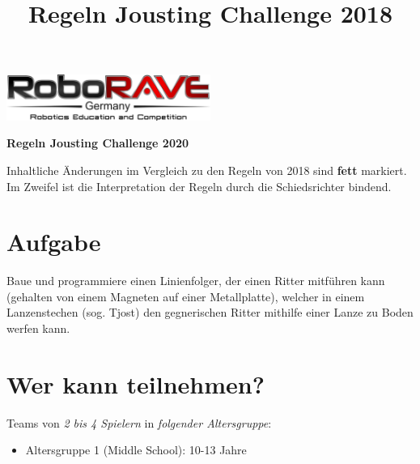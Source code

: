 \documentclass[a4paper,12pt]{article}
\begin{document}
\title{Regeln Jousting Challenge 2018}

 \begin{center}
\includegraphics[width=0.5\textwidth]{logo.png}

\huge                      %
\bfseries                   %
Regeln Jousting Challenge 2020
  \end{center}
Inhaltliche Änderungen im Vergleich zu den Regeln von 2018 sind \textbf{fett} markiert. Im Zweifel ist die Interpretation der Regeln durch die Schiedsrichter bindend.
\section{Aufgabe}
Baue und programmiere einen Linienfolger, der einen Ritter mitführen kann
(gehalten von einem Magneten auf einer Metallplatte), welcher in einem
Lanzenstechen (sog. Tjost) den gegnerischen Ritter mithilfe einer
Lanze zu Boden werfen kann.
\section{Wer kann teilnehmen?}
Teams von \emph{2 bis 4 Spielern} in \emph{folgender Altersgruppe}:
\begin{itemize}
	\item Altersgruppe 1 (Middle School): 10-13 Jahre
\end{itemize}
\end{document}
